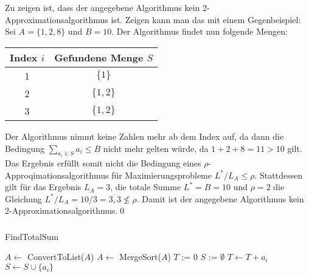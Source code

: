 \documentclass[a4paper]{article}
\begin{document}
	\maketitle
	\section{}
		\subsubsection{}
		Zu zeigen ist, dass der angegebene Algorithmus kein 2-Approximationsalgorithmus ist. Zeigen kann man das mit einem Gegenbeispiel:\n
		Sei $A=\{1, 2, 8\}$ und $B=10$. Der Algorithmus findet nun folgende Mengen:
		\begin{center}
			\begin{tabular}{c|c}
				Index $i$ & Gefundene Menge $S$\\\hline
				1 & $\{1\}$\\
				2 & $\{1, 2\}$\\
				3 & $\{1, 2\}$\\
			\end{tabular}
		\end{center}
		Der Algorithmus nimmt keine Zahlen mehr ab dem Index auf, da dann die Bedingung $\sum\limits_{a_i\in S} a_i\leq B$ nicht mehr gelten würde, da $1+2+8=11>10$ gilt.\n
		Das Ergebnis erfüllt somit nicht die Bedingung eines $\rho$-Approqimationsalgorithmus für Maximierungsprobleme $L^*/L_A\leq \rho$. Stattdessen gilt für das Ergebnis $L_A=3$, die totale Summe $L^*=B=10$ und $\rho=2$ die Gleichung $L^*/L_A=10/3=\overline{3,3}\not\leq\rho$.\n
		Damit ist der angegebene Algorithmus kein 2-Approximationsalgorithmus.\qed
		\newpage
		\subsubsection{}
		\begin{breakablealgorithm}
			\caption{FindTotalSum}
			\begin{algorithmic}[1]
					\State $A \leftarrow$ ConvertToList($A$)
					\State $A \leftarrow$ MergeSort($A$)
					\State $T$ := 0
					\State $S$ := $\emptyset$
							\State $T\leftarrow T+a_i$
							\State $S\leftarrow S\cup \{a_i\}$
						\EndIf
					\EndFor
				\EndProcedure
			\end{algorithmic}
		\end{breakablealgorithm}
\end{document}
